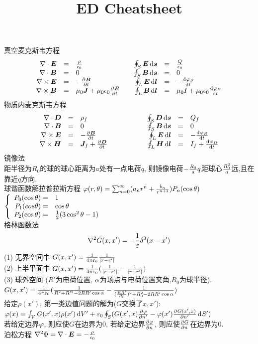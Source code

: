 \documentclass[UTF8,8pt]{ctexart}
\title{ED Cheatsheet}
\begin{document}
 
\leftmargini=5mm
\raggedright
\footnotesize
\begin{multicols}{3}
    真空麦克斯韦方程 
    $$\ar[rclrcll]{
        \nabla\cdot\bm{E}&=&\f{\rho}{\epsilon_0}&\quad \oint_S\bm{E}\d \bm{s}&=&\f{Q}{\epsilon_0}\\
        \nabla\cdot\bm{B}&=&0&\quad \oint_S\bm{B}\d \bm{s}&=&0\\
        \nabla\times\bm{E}&=&-\pt{\bm{B}}&\quad \oint_L\bm{E}\d \bm{l}&=&-\dt{\varphi_B}\\
        \nabla\times\bm{B}&=&\mu_0\bm{J}+\mu_0\epsilon_0 \pt{\bm{E}}&\quad \oint_L\bm{B}\d \bm{l}&=&\mu_0I+\mu_0\epsilon_0\dt{\varphi_E}
    }$$
    物质内麦克斯韦方程
    $$\ar[rclrcll]{
        \nabla\cdot\bm{D}&=&\rho_f&\qquad \oint_S\bm{D}\d \bm{s}&=&Q_f\\
        \nabla\cdot\bm{B}&=&0&\qquad \oint_S\bm{B}\d \bm{s}&=&0\\
        \nabla\times\bm{E}&=&-\pt{\bm{B}}&\qquad\quad\qquad \oint_L\bm{E}\d \bm{l}&=&-\dt{\varphi_B}\\
        \nabla\times\bm{H}&=&\bm{J}_f+\pt{\bm{D}}&\qquad \oint_L\bm{H}\d \bm{l}&=&I_f+\dt{\varphi_D}
    }$$
    镜像法\\
    距半径为$R_0$的球的球心距离为$a$处有一点电荷$q$, 则镜像电荷$-\f{R_0}{a}q$距球心$\f{R_0^2}{a}$远,且在靠近$q$方向.\\
    球谐函数解拉普拉斯方程
    $\vp(r,\t)=\sum_{n=0}^\infty(a_nr^n+\f{b_n}{r^{n+1}})P_n(\cos\t)$
    $\left\{\ar{
        P_0(\cos\t)=&1\\
        P_1(cos\t)=&\cos\t\\
        P_2(\cos\t)=&\ff{2}(3\cos^2\t-1)
    }\right.$\\
    格林函数法
    $$\nabla^2G(x,x')=-\ff{\ep}\de^3(x-x')$$
    (1) 无界空间中 $G(x,x')=\ca\ff{\abs{r-r'}}$\\
    (2) 上半平面中 $G(x,x')=\ca(\ff{\abs{r-r'}}-\ff{\abs{r+r'}})$\\
    (3) 球外空间 ($R'$为电荷位置, $\a$为场点与电荷位置夹角,$R_0$为球半径). $G(x,x')=\ca(\ff{R^2+R'^2-2RR'\cos\a}-\ff{(\f{RR'}{R_0})^2+R_0^2-2RR'\cos\a})$\\
    给定$\rho(x')$, 第一类边值问题的解为($G$交换了$x,x'$):
    $\vp(x)=\int_VG(x',x)\rho(x')\d V'+\ep_0\oint_S(G(x',x)\pp{\vp}{n'}-\vp(x')\pp{G(x',x)}{n'}\d S')$\\
    若给定边界$\vp$, 则应使$G$在边界为0, 若给定边界$\pp{\vp}{n}$, 则应使$\pp{G}{n}$在边界为0.\\
    泊松方程 ${\nabla}^2 \Phi =\div\bm{E}= - {\rho \over \epsilon_0}$\\

\end{multicols}
\end{document}

